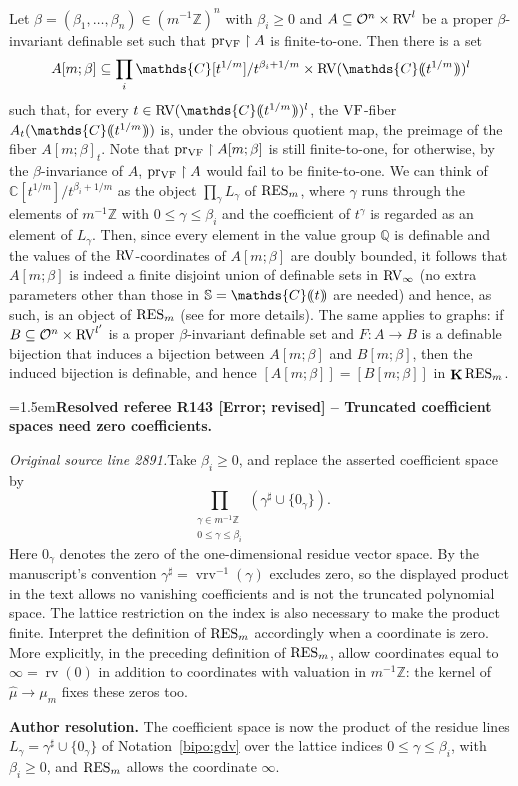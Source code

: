 \documentclass[12pt]{amsart}
\newcommand{\ResolvedRefereeRemark}[5]{%
  \par\medskip\begingroup\normalfont\small\color{gray}%
  \emergencystretch=1.5em\noindent\textbf{Resolved referee R#1 [#2] -- #3.}\par\nobreak\noindent #4\par
  \medskip\color{ResolutionGreen}\noindent\textbf{Author resolution.} #5\par
  \endgroup\medskip
}
\theoremstyle{plain}
\theoremstyle{definition}
\theoremstyle{remark}
\numberwithin{equation}{section}
\theoremstyle{plain}
\newcommand{\VF}{\textup{VF}}
\newcommand{\RV}{\textup{RV}}
\newcommand{\OO}{\mdl O}
\newcommand{\Z}{\mathds{Z}}
\newcommand{\C}{\mathds{C}}
\newcommand{\Q}{\mathds{Q}}
\newcommand{\0}{\emptyset}
\newcommand{\dpar}[1]{%
   (\mkern-4mu (#1 )\mkern-4mu )}
\newcommand{\mdl}[1]{\mathcal{#1}}  %
\newcommand{\rest}{\upharpoonright}
\newcommand{\fun}{\longrightarrow}
\newcommand{\sub}{\subseteq}
\newcommand{\RES}{\textup{RES}}
\DeclareMathOperator{\rv}{rv}
\DeclareMathOperator{\ggk}{\mathbf{K}}
\DeclareMathOperator{\vrv}{vrv}
\DeclareMathOperator{\pvf}{pr_{\VF}}
\begin{document}
Let $\beta = (\beta_1, \ldots, \beta_n) \in (m^{-1} \Z)^n$ with $\beta_i \geq 0$ and $A \sub \OO^n \times \RV^l$ be a proper $\beta$-invariant definable set such that $\pvf \rest A$ is finite-to-one. Then there is a set
\[
A[m;\beta] \sub \prod_i \C[t^{1/m}] / t^{\beta_i + 1/m} \times \RV(\C \dpar{t^{1/m}})^l
\]
such that, for every $t \in \RV(\C \dpar{t^{1/m}})^l$, the $\VF$-fiber $A_t(\C \dpar{t^{1/m}})$ is, under the obvious quotient map, the preimage of the fiber $A[m;\beta]_t$. Note that $\pvf \rest A[m;\beta]$ is still finite-to-one, for otherwise, by the $\beta$-invariance of $A$, $\pvf \rest A$ would fail to be finite-to-one. We can think of $\C[t^{1/m}] / t^{\beta_i + 1/m}$ as the object $\prod_{\gamma} L_\gamma$ of $\RES_{m}$, where $\gamma$ runs through the elements of $m^{-1}\Z$ with $0 \leq \gamma \leq \beta_i$ and the coefficient of $t^\gamma$ is regarded as an element of $L_\gamma$. Then, since every element in the value group $\Q$ is definable and the values of the $\RV$-coordinates of $A[m;\beta]$ are doubly bounded,  it follows that  $A[m;\beta]$ is indeed a finite disjoint union of definable sets in $\RV_\infty$ (no extra parameters other than those in $\mathbb{S} = \C \dpar{ t }$ are needed) and hence, as such, is an object of $\RES_{m}$ (see \cite[\S~4.2]{hru:loe:lef} for more details). The same applies to graphs: if $B \sub \OO^n \times \RV^{l'}$ is a proper $\beta$-invariant definable set and $F : A \fun B$ is a definable bijection that induces a bijection between $A[m;\beta]$ and $B[m;\beta]$, then the induced bijection is definable, and hence $[A[m;\beta]] = [B[m;\beta]]$ in $\ggk \RES_m$.

\ResolvedRefereeRemark{143}{Error; revised}{Truncated coefficient spaces need zero coefficients}{%
\textit{Original source line 2891.}\quad Take $\beta_i\geq0$, and replace the asserted coefficient space by
\[
 \prod_{\substack{\gamma\in m^{-1}\Z\\0\leq\gamma\leq\beta_i}}
       (\gamma^\sharp\cup\{0_\gamma\}).
\]
Here $0_\gamma$ denotes the zero of the one-dimensional residue vector space. By the manuscript's convention $\gamma^\sharp=\vrv^{-1}(\gamma)$ excludes zero, so the displayed product in the text allows no vanishing coefficients and is not the truncated polynomial space. The lattice restriction on the index is also necessary to make the product finite. Interpret the definition of $\RES_m$ accordingly when a coordinate is zero. More explicitly, in the preceding definition of $\RES_m$, allow coordinates equal to $\infty=\rv(0)$ in addition to coordinates with valuation in $m^{-1}\Z$: the kernel of $\hat\mu\to\mu_m$ fixes these zeros too.
}{The coefficient space is now the product of the residue lines $L_\gamma=\gamma^\sharp\cup\{0_\gamma\}$ of Notation~\ref{bipo:gdv} over the lattice indices $0\leq\gamma\leq\beta_i$, with $\beta_i\geq0$, and $\RES_m$ allows the coordinate $\infty$.}
\end{document}
